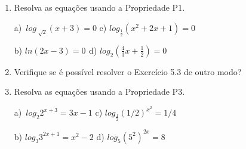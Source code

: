 \documentclass[12pt]{article}
\begin{document}
\begin{enumerate}[label*={\fontsize{14pt}{14pt}\selectfont \textbf{\arabic*.}}]
\begin{enumerate}
\begin{adjustwidth}{0.5in}{0.0in}
\begin{justify}
b)  \( 500=5 \cdot e^{2t^{2}} \) \  \tab \tab  e)\ \   \( e^{x^{2}+3}=e^{4x} \) 
\end{justify}\par

\end{adjustwidth}

\begin{adjustwidth}{0.5in}{0.0in}
\begin{justify}
c)  \( e^{3x+2}=1 \) \tab \tab \tab  f)  \( 2=10^{x-4} \) 
\end{justify}\par

\end{adjustwidth}

	\item Resolva as equações usando a Propriedade P1.\par

\begin{justify}
a)\   \( log_{\sqrt[]{2}} \left( x+3 \right) =0 \) \tab \tab c)  \( log_{\frac{1}{2}} \left( x^{2}+2x+1 \right) =0 \) \  
\end{justify}\par

\begin{justify}
b)  \( ln \left( 2x-3 \right) =0 _{} \) \tab \tab d)  \( log_{2} \left( \frac{4}{3}x+\frac{1}{2}  \right) =0 \) 
\end{justify}\par

	\item Verifique se é possível resolver o Exercício 5.3 de outro modo?\par

	\item Resolva as equações usando a Propriedade P3.\par

\begin{justify}
a)\   \( log_{2}2^{x+3}=3x-1 \) \tab \tab c)  \( log_{\frac{1}{2}} \left( 1/2 \right) ^{x^{2}}=1/4 \) \  
\end{justify}\par

\begin{justify}
b)  \( log_{3}3^{2x+1}=x^{2}-2 \) \tab \tab d)  \( log_{5} \left( 5^{2}  \right) ^{2x}=8 \) 
\end{justify}\par


\end{enumerate}
\end{enumerate}
\end{document}
